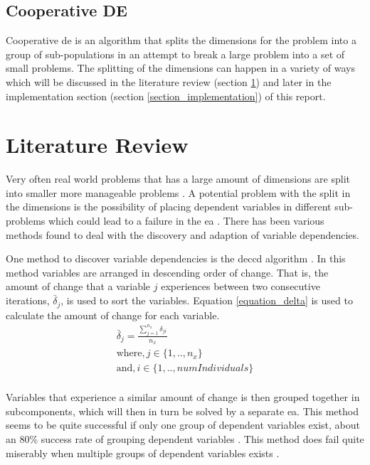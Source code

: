 \documentclass[hidelinks,english,conference]{IEEEtran}
\begin{document}
	\subsection{Cooperative DE}
		Cooperative \gls{de} is an algorithm that splits the dimensions for the problem into a group of sub-populations in an attempt to break a large problem into a set of small problems. The splitting of the dimensions can happen in a variety of ways which will be discussed in the literature review (section \ref{section_literature_review}) and later in the implementation section (section \ref{section_implementation}) of this report.
        
\section{Literature Review}\label{section_literature_review}
	Very often real world problems that has a large amount of dimensions are split into smaller more manageable problems \cite{dai2016cooperative}. A potential problem with the split in the dimensions is the possibility of placing dependent variables in different sub-problems which could lead to a failure in the \gls{ea} \cite{dai2016cooperative}. There has been various methods found to deal with the discovery and adaption of variable dependencies.
    
    One method to discover variable dependencies is the \gls{deccd} algorithm \cite{omidvar2010cooperative}. In this method variables are arranged in descending order of change. That is, the amount of change that a variable $j$ experiences between two consecutive iterations, $\bar{\delta}_j$, is used to sort the variables. Equation \ref{equation_delta} \cite{omidvar2010cooperative} is used to calculate the amount of change for each variable.
    \begin{equation}
      \begin{split}
      \bar{\delta}_j = \frac{\sum^{n_x}_{j=1}\delta_{ji}}{n_x}\\ 
      \text{where}, j \in \lbrace 1,..,n_x \rbrace\\
      \text{and}, i \in \lbrace 1,..,numIndividuals \rbrace\\
      \end{split}
      \label{equation_delta}
    \end{equation}
    
    Variables that experience a similar amount of change is then grouped together in subcomponents, which will then in turn be solved by a separate \gls{ea}. This method seems to be quite successful if only one group of dependent variables exist, about an 80\% success rate of grouping dependent variables \cite{dai2016cooperative}. This method does fail quite miserably when multiple groups of dependent variables exists \cite{dai2016cooperative}.
    
\end{document}
